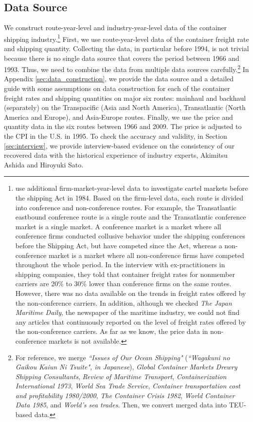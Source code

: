 \documentclass[11pt]{article}
\begin{document}
\subsection{Data Source}\label{subsec:data}
We construct route-year-level and industry-year-level data of the container shipping industry.\footnote{\cite{matsuda2022disentangling} use additional firm-market-year-level data to investigate cartel markets before the shipping Act in 1984. Based on the firm-level data, each route is divided into conference and non-conference routes. For example, the Transatlantic eastbound conference route is a single route and the Transatlantic conference market is a single market. A conference market is a market where all conference firms conducted collusive behavior under the shipping conferences before the Shipping Act, but have competed since the Act, whereas a non-conference market is a market where all non-conference firms have competed throughout the whole period. In the interview with ex-practitioners in shipping companies, they told that container freight rates for nonmember carriers are 20\% to 30\% lower than conference firms on the same routes. However, there was no data available on the trends in freight rates offered by the non-conference carriers. In addition, although we checked \textit{The Japan Maritime Daily}, the newspaper of the maritime industry, we could not find any articles that continuously reported on the level of freight rates offered by the non-conference carriers. As far as we know, the price data in non-conference markets is not available.} First, we use route-year-level data of the container freight rate and shipping quantity. Collecting the data, in particular before 1994, is not trivial because there is no single data source that covers the period between 1966 and 1993. Thus, we need to combine the data from multiple data sources carefully.\footnote{For reference, we merge \textit{``Issues of Our Ocean Shipping"} (\textit{``Wagakuni no Gaikou Kaiun Ni Tsuite", in Japanese}), \textit{Global Container Markets Drewry Shipping Consultants}, \textit{Review of Maritime Transport}, \textit{Containerization International 1973}, \textit{World Sea Trade Service}, \textit{Container transportation cost and profitability 1980/2000}, \textit{The Container Crisis 1982}, \textit{World Container Data 1985}, and \textit{World's sea trades}. Then, we convert merged data into TEU-based data.} In Appendix \ref{sec:data_construction}, we provide the data source and a detailed guide with some assumptions on data construction for each of the container freight rates and shipping quantities on major six routes: mainhaul and backhaul (separately) on the Transpacific (Asia and North America), Transatlantic (North America and Europe), and Asia-Europe routes. Finally, we use the price and quantity data in the six routes between 1966 and 2009. The price is adjusted to the CPI in the U.S. in 1995. To check the accuracy and validity, in Section \ref{sec:interview}, we provide interview-based evidence on the consistency of our recovered data with the historical experience of industry experts, Akimitsu Ashida and Hiroyuki Sato.
\end{document}
